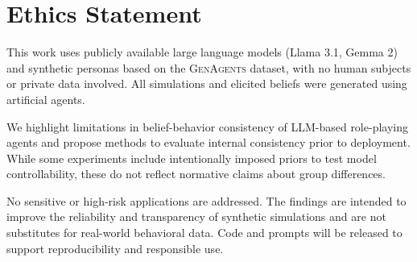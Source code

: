\documentclass{article} %
\begin{document}
% 
% 



\section*{Ethics Statement}

This work uses publicly available large language models (Llama 3.1, Gemma 2) and synthetic personas based on the \textsc{GenAgents} dataset, with no human subjects or private data involved. All simulations and elicited beliefs were generated using artificial agents.

We highlight limitations in belief-behavior consistency of LLM-based role-playing agents and propose methods to evaluate internal consistency prior to deployment. While some experiments include intentionally imposed priors to test model controllability, these do not reflect normative claims about group differences.

No sensitive or high-risk applications are addressed. The findings are intended to improve the reliability and transparency of synthetic simulations and are not substitutes for real-world behavioral data. Code and prompts will be released to support reproducibility and responsible use.





\newpage
\end{document}
